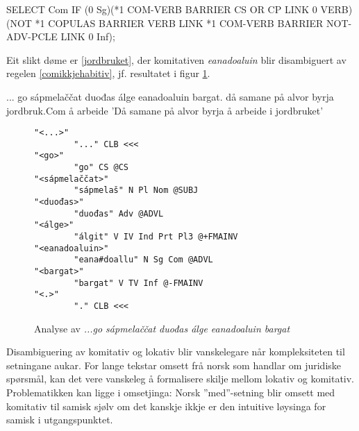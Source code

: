 \documentclass[a4paper,norsk]{article}
\begin{document}
\begin{example}\label{comikkjehabitiv}
SELECT Com IF (0 Sg)(*1 COM-VERB BARRIER CS OR CP LINK 0 VERB)
	(NOT *1 COPULAS BARRIER VERB LINK *1 COM-VERB BARRIER NOT-ADV-PCLE 
	LINK 0 Inf);    
\end{example}

Eit slikt døme er \ref{jordbruket}, der komitativen \emph{eanadoaluin} blir disambiguert av regelen \ref{comikkjehabitiv}, jf. resultatet i figur \ref{comverbana}.%

\begin{example}\label{jordbruket}
\gll ... go sápmelaččat duođas álge eanadoaluin bargat.
     {}  då samane {på alvor} byrja jordbruk.Com {å arbeide}
\glt 'Då samane på alvor byrja å arbeide i jordbruket'
\glend     
\end{example}

\begin{figure}[htbp]
\begin{center}
\begin{verbatim}
"<...>"
        "..." CLB <<<
"<go>"
        "go" CS @CS
"<sápmelaččat>"
        "sápmelaš" N Pl Nom @SUBJ
"<duođas>"
        "duođas" Adv @ADVL
"<álge>"
        "álgit" V IV Ind Prt Pl3 @+FMAINV
"<eanadoaluin>"
        "eana#doallu" N Sg Com @ADVL
"<bargat>"
        "bargat" V TV Inf @-FMAINV
"<.>"
        "." CLB <<<
\end{verbatim}
\caption{Analyse av \textit{...go sápmelaččat duođas álge eanadoaluin bargat}}
\label{comverbana}
\end{center}
\end{figure}



Disambiguering av komitativ og lokativ blir vanskelegare når kompleksiteten til setningane aukar. For lange tekstar omsett frå norsk som handlar om juridiske spørsmål, kan det vere vanskeleg å formalisere skilje mellom lokativ og komitativ. Problematikken kan ligge i omsetjinga: Norsk ''med''-setning blir omsett med komitativ til samisk sjølv om det kanskje ikkje er den intuitive løysinga for samisk i utgangspunktet. %

\end{document}
